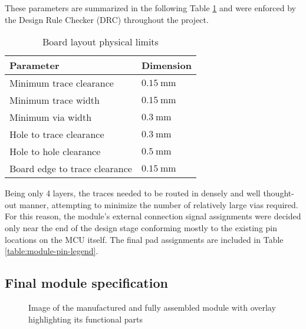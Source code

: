 These parameters are summarized in the following Table \ref{table:board-limits} and were enforced by the Design Rule Checker (DRC) throughout the project.

\begin{table}[H]
\begin{center}
\caption{\label{table:board-limits}Board layout physical limits}
    \begin{tabular}{|l|l|} \hline
    \textbf{Parameter}          & \textbf{Dimension} \\ \hline
    Minimum trace clearance & $0.15~\mathrm{mm}$ \\ \hline
    Minimum trace width & $0.15~\mathrm{mm}$ \\ \hline
    Minimum via width & $0.3~\mathrm{mm}$ \\ \hline
    Hole to trace clearance & $0.3~\mathrm{mm}$ \\ \hline
    Hole to hole clearance & $0.5~\mathrm{mm}$ \\ \hline
    Board edge to trace clearance & $0.15~\mathrm{mm}$ \\ \hline
    \end{tabular}
\end{center}
\end{table}

Being only 4 layers, the traces needed to be routed in densely and well thought-out manner, attempting to minimize the number of relatively large vias required. For this reason, the module's external connection signal assignments were decided only near the end of the design stage conforming mostly to the existing pin locations on the MCU itself. The final pad assignments are included in Table \ref{table:module-pin-legend}.

\subsection{Final module specification}
\begin{figure}
    
    \caption{\label{fig:module-v0.1}Image of the manufactured and fully assembled module with overlay highlighting its functional parts}
\end{figure}

